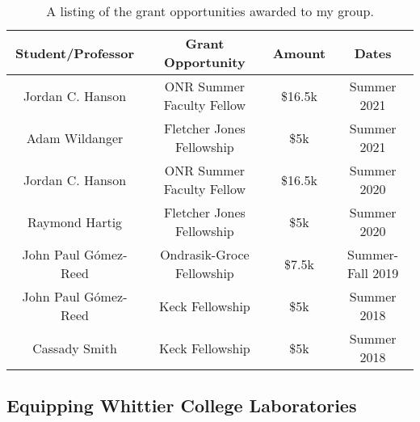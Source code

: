 \documentclass[../../../main.tex]{subfiles}
\begin{document}
\begin{table}
\centering
\begin{tabular}{c c c c}
Student/Professor & Grant Opportunity & Amount & Dates \\ \hline
Jordan C. Hanson & ONR Summer Faculty Fellow & \$16.5k & Summer 2021 \\
Adam Wildanger & Fletcher Jones Fellowship & \$5k & Summer 2021 \\
Jordan C. Hanson & ONR Summer Faculty Fellow & \$16.5k & Summer 2020 \\
Raymond Hartig & Fletcher Jones Fellowship & \$5k & Summer 2020 \\
John Paul G\'{o}mez-Reed & Ondrasik-Groce Fellowship & \$7.5k & Summer-Fall 2019 \\
John Paul G\'{o}mez-Reed & Keck Fellowship & \$5k & Summer 2018 \\
Cassady Smith & Keck Fellowship & \$5k & Summer 2018 \\
\end{tabular}
\caption{\label{tab:funds} A listing of the grant opportunities awarded to my group.}
\end{table}
 
\subsection{Equipping Whittier College Laboratories}
\end{document}
